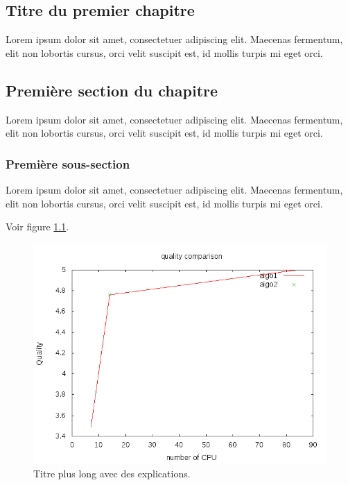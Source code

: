 \begin{bibunit}

\clearemptydoublepage
\chapter{Titre du premier chapitre}

Lorem ipsum dolor sit amet, consectetuer adipiscing elit. Maecenas fermentum, elit non lobortis cursus, orci velit suscipit est, id mollis turpis mi eget orci.

\section{Première section du chapitre}

Lorem ipsum dolor sit amet, consectetuer adipiscing elit. Maecenas fermentum, elit non lobortis cursus, orci velit suscipit est, id mollis turpis mi eget orci.

\subsection{Première sous-section}

Lorem ipsum dolor sit amet, consectetuer adipiscing elit. Maecenas fermentum, elit non lobortis cursus, orci velit suscipit est, id mollis turpis mi eget orci.

Voir figure \ref{fig:mafigure2}.


\begin{figure}[htbp]
   \begin{center}
      \includegraphics[width=0.8\linewidth]{Chapitre1/Ch1-Figures/comparison.png}
   \end{center}
   \caption[titre court pour la liste des figures]
   {\footnotesize Titre plus long avec des explications.}
   \label{fig:mafigure2}
\end{figure}


\end{bibunit}
